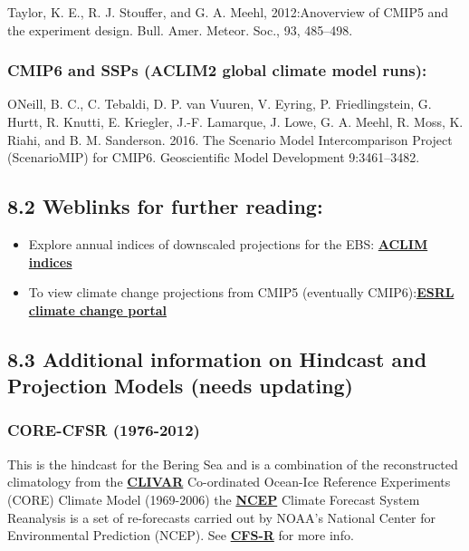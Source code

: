 \documentclass[
]{article}
\begin{document}
Taylor, K. E., R. J. Stouffer, and G. A. Meehl, 2012:Anoverview of CMIP5
and the experiment design. Bull. Amer. Meteor. Soc., 93, 485--498.

\hypertarget{cmip6-and-ssps-aclim2-global-climate-model-runs}{%
\subsubsection{CMIP6 and SSPs (ACLIM2 global climate model
runs):}\label{cmip6-and-ssps-aclim2-global-climate-model-runs}}

ONeill, B. C., C. Tebaldi, D. P. van Vuuren, V. Eyring, P.
Friedlingstein, G. Hurtt, R. Knutti, E. Kriegler, J.-F. Lamarque, J.
Lowe, G. A. Meehl, R. Moss, K. Riahi, and B. M. Sanderson. 2016. The
Scenario Model Intercomparison Project (ScenarioMIP) for CMIP6.
Geoscientific Model Development 9:3461--3482.

\hypertarget{weblinks-for-further-reading}{%
\subsection{8.2 Weblinks for further
reading:}\label{weblinks-for-further-reading}}

\begin{itemize}
\item
  Explore annual indices of downscaled projections for the EBS:
  \href{https://kholsman.shinyapps.io/aclim/}{\textbf{ACLIM indices}}
\item
  To view climate change projections from CMIP5 (eventually
  CMIP6):\href{https://www.esrl.noaa.gov/psd/ipcc/ocn/}{\textbf{ESRL
  climate change portal }}
\end{itemize}

\hypertarget{additional-information-on-hindcast-and-projection-models-needs-updating}{%
\subsection{8.3 Additional information on Hindcast and Projection Models
(needs
updating)}\label{additional-information-on-hindcast-and-projection-models-needs-updating}}

\hypertarget{core-cfsr-1976-2012}{%
\subsubsection{CORE-CFSR (1976-2012)}\label{core-cfsr-1976-2012}}

This is the hindcast for the Bering Sea and is a combination of the
reconstructed climatology from the
\href{http://portal.aoos.org/bering-sea.php\#module-metadata/5626a0b6-7d79-11e3-ac17-00219bfe5678/0756e6c2-a8e2-40af-aa3d-22051ed68067}{\textbf{CLIVAR}}
Co-ordinated Ocean-Ice Reference Experiments (CORE) Climate Model
(1969-2006) the
\href{http://portal.aoos.org/bering-sea.php\#module-metadata/f8cb79f6-7d59-11e3-a6ee-00219bfe5678/2deb2eca-f3f5-4eda-a132-112468711de7}{\textbf{NCEP}}
Climate Forecast System Reanalysis is a set of re-forecasts carried out
by NOAA's National Center for Environmental Prediction (NCEP). See
\href{http://cfs.ncep.noaa.gov/cfsr/}{\textbf{CFS-R}} for more info.
\end{document}
